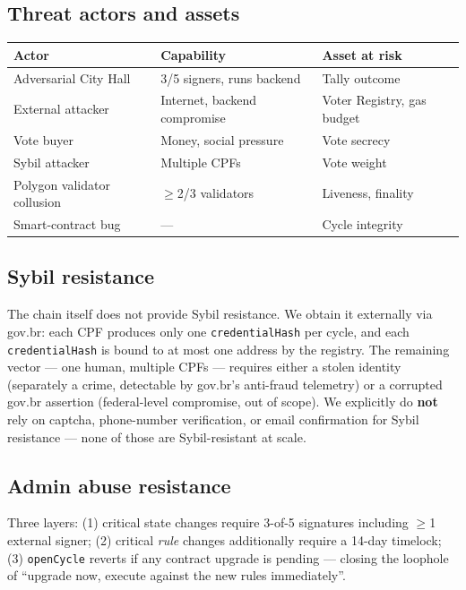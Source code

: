 \documentclass[12pt]{article}
\begin{document}
\subsection{Threat actors and assets}

\begin{center}
\begin{tabular}{l p{} p{}}
\toprule
\textbf{Actor} & \textbf{Capability} & \textbf{Asset at risk} \\
\midrule
Adversarial City Hall & 3/5 signers, runs backend & Tally outcome \\
External attacker & Internet, backend compromise & Voter Registry, gas budget \\
Vote buyer & Money, social pressure & Vote secrecy \\
Sybil attacker & Multiple CPFs & Vote weight \\
Polygon validator collusion & \(\geq\)2/3 validators & Liveness, finality \\
Smart-contract bug & --- & Cycle integrity \\
\bottomrule
\end{tabular}
\end{center}

\subsection{Sybil resistance}

The chain itself does not provide Sybil resistance. We obtain it externally
via gov.br: each CPF produces only one \texttt{credentialHash} per cycle, and
each \texttt{credentialHash} is bound to at most one address by the registry.
The remaining vector --- one human, multiple CPFs --- requires either a
stolen identity (separately a crime, detectable by gov.br's anti-fraud
telemetry) or a corrupted gov.br assertion (federal-level compromise, out of
scope). We explicitly do \textbf{not} rely on captcha, phone-number
verification, or email confirmation for Sybil resistance --- none of those
are Sybil-resistant at scale.

\subsection{Admin abuse resistance}

Three layers: (1) critical state changes require 3-of-5 signatures including
\(\geq\)1 external signer; (2) critical \emph{rule} changes additionally
require a 14-day timelock; (3) \texttt{openCycle} reverts if any contract
upgrade is pending --- closing the loophole of ``upgrade now, execute against
the new rules immediately''.
\end{document}
